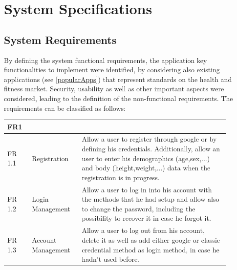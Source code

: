 \newpage
\section{System Specifications}
\subsection{System Requirements}
By defining the system functional requirements, the application key functionalities to implement were identified, by considering also existing applications (see \cref{popularApps}) that represent standards on the health and fitness market. Security, usability as well as other important aspects were considered, leading to the definition of the non-functional requirements. The requirements can be classified as follows:
\vspace{5ex}
\begin{table}[h!]
    \setstretch{\myspacing}
    \centering
    \begin{tabular}{|>{\raggedright\arraybackslash}p{0.1\linewidth}|>{\raggedright\arraybackslash}p{0.2\linewidth}|>{\raggedright\arraybackslash}p{0.6\linewidth}|}
        \hline
        \textbf{FR1} & \multicolumn{2}{>{\centering\arraybackslash}p{0.7\linewidth}|}{\textbf{User Management}} \\
        \hline
        FR 1.1 & Registration & Allow a user to register through google or by defining his credentials. Additionally, allow an user to enter his demographics (age,sex,...) and body (height,weight,...) data when the registration is in progress. \\
        \hline
        FR 1.2 & Login Management & Allow a user to log in into his account with the methods that he had setup and allow also to change the password, including the possibility to recover it in case he forgot it.  \\
        \hline
        FR 1.3 & Account Management & Allow a user to log out from his account, delete it as well as add either google or classic credential method as login method, in case he hadn't used before.  \\
        \hline
    \end{tabular}
\end{table}


